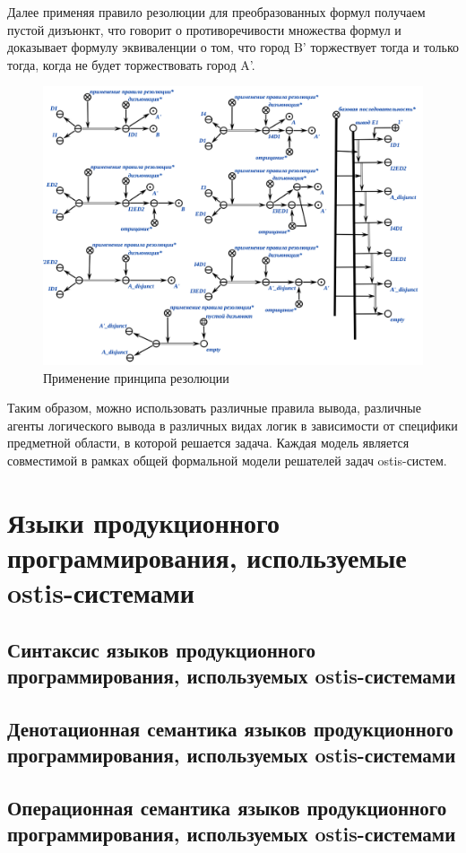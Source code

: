 Далее применяя правило резолюции для преобразованных формул получаем пустой дизъюнкт, что говорит о противоречивости множества формул и доказывает формулу эквиваленции о том, что город B' торжествует тогда и только тогда, когда не будет торжествовать город A'.

\begin{figure}[H]
	\includegraphics[scale=0.7]{author/part3/figures/resolution_inference.png}
	\caption{Применение принципа резолюции}
	\label{fig:resolution_inference}
\end{figure}

Таким образом, можно использовать различные правила вывода, различные агенты логического вывода в различных видах логик в зависимости от специфики предметной области, в которой решается задача. Каждая модель является совместимой в рамках общей формальной модели решателей задач ostis-систем.

\section{Языки продукционного программирования, используемые ostis-системами}
\subsection{Синтаксис языков продукционного программирования, используемых ostis-системами}
\subsection{Денотационная семантика языков продукционного программирования, используемых ostis-системами}
\subsection{Операционная семантика языков продукционного программирования, используемых ostis-системами}

%